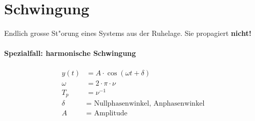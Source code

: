 %
%

\section{Schwingung}
Endlich grosse St"orung eines Systems aus der Ruhelage. Sie propagiert \textbf{nicht!}

\paragraph{Spezialfall: harmonische Schwingung}
\begin{align*}
	y(t) &= A\cdot\cos(\omega t+\delta) \\
	\omega &= 2\cdot\pi\cdot\nu \\
	T_p &= \nu^{-1} \\
	\delta &= \text{ Nullphasenwinkel, Anphasenwinkel} \\
	A &= \text{ Amplitude}
\end{align*}

